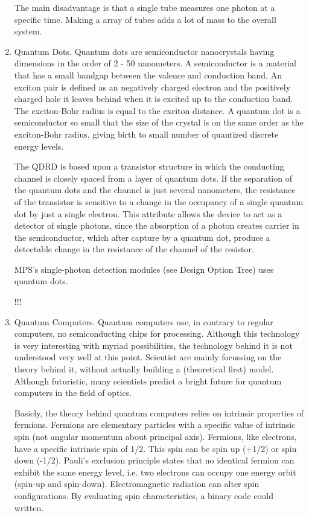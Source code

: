 \begin{enumerate}[i]
The main disadvantage is that a single tube measures one photon at a specific time. Making a array of tubes adds a lot of mass to the overall system. 

\item Quantum Dots. Quantum dots are semiconductor nanocrystals having dimensions in the order of 2 - 50 nanometers. A semiconductor is a material that has a small bandgap between the valence and conduction band. An exciton pair is defined as an negatively charged electron and the positively charged hole it leaves behind when it is excited up to the conduction band. The exciton-Bohr radius is equal to the exciton distance. A quantum dot is a semiconductor so small that the size of the crystal is on the same order as the exciton-Bohr radius, giving birth to small number of quantized discrete energy levels. 

The \acs{QDRD} is based upon a transistor structure in which the conducting channel is closely spaced from a layer of quantum dots. If the separation of the quantum dots and the channel is just several nanometers, the resistance of the transistor is sensitive to a change in the occupancy of a single quantum dot by just a single electron. This attribute allows the device to act as a detector of single photons, since the absorption of a photon creates carrier in the semiconductor, which after capture by a quantum dot, produce a detectable change in the resistance of the channel of the resistor.

MPS's single-photon detection modules (see Design Option Tree) uses quantum dots.

\picutre!!!

\item Quantum Computers. Quantum computers use, in contrary to regular computers, no semiconducting chips for processing. Although this technology is very interesting with myriad possibilities, the technology behind it is not understood very well at this point. Scientist are mainly focussing on the theory behind it, without actually building a (theoretical first) model. Although futuristic, many scientists predict a bright future for quantum computers in the field of optics.

Basicly, the theory behind quantum computers relies on intrinsic properties of fermions. Fermions are elementary particles with a specific value of intrinsic spin (not angular momentum about principal axis). Fermions, like electrons, have a specific intrinsic spin of 1/2. This spin can be spin up (+1/2) or spin down (-1/2). Pauli's exclusion principle states that no identical fermion can exhibit the same energy level, i.e. two electrons can occupy one energy orbit (spin-up and spin-down). Electromagnetic radiation can alter spin configurations. By evaluating spin characteristics, a binary code could written.
	

\end{enumerate}
